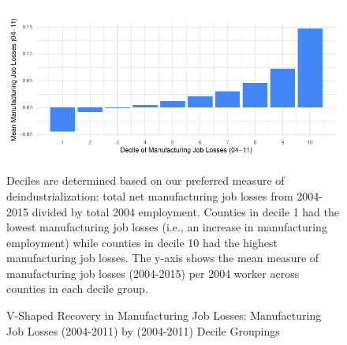 \documentclass[]{AEA}
\begin{document}
\begin{figure} 
\caption{V-Shaped Recovery in Manufacturing Job Losses: Manufacturing Job Losses (2004-2011) by (2004-2011) Decile Groupings}
\label{fig:vShapePlot1}

\begin{center}\includegraphics{Final-Draft_files/figure-latex/unnamed-chunk-10-1} \end{center}



\FloatBarrier
\begin{figurenotes}
Deciles are determined based on our preferred measure of deindustrialization: total net manufacturing job losses from 2004-2015 divided by total 2004 employment. Counties in decile 1 had the lowest manufacturing job losses (i.e., an increase in manufacturing employment) while counties in decile 10 had the highest manufacturing job losses. The y-axis shows the mean measure of manufacturing job losses (2004-2015) per 2004 worker across counties in each decile group.
\end{figurenotes}
\end{figure}
\end{document}

